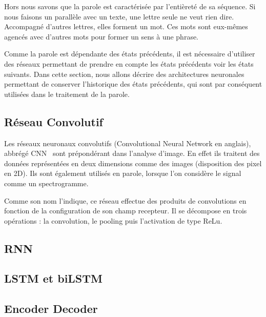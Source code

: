 Hors nous savons que la parole est caractérisée par l'entièreté de sa séquence. Si nous faisons un parallèle avec un texte, une lettre seule ne veut rien dire. Accompagné d'autres lettres, elles forment un mot. Ces mots sont eux-mêmes agencés avec d'autres mots pour former un sens à une phrase.

Comme la parole est dépendante des états précédents, il est nécessaire d'utiliser des réseaux permettant de prendre en compte les états précédents voir les états suivants. Dans cette section, nous allons décrire des architectures neuronales permettant de conserver l'historique des états précédents, qui sont par conséquent utilisées dans le traitement de la parole.

\subsection{Réseau Convolutif}
Les réseaux neuronaux convolutifs (Convolutional Neural Network en anglais), abbrégé CNN~\cite{LeCun1990} sont prépondérant dans l'analyse d'image. En effet ils traitent des données représentées en deux dimensions comme des images (disposition des pixel en 2D). Ils sont également utilisés en parole, lorsque l'on considère le signal comme un spectrogramme.

Comme son nom l'indique, ce réseau effectue des produits de convolutions en fonction de la configuration de son champ recepteur. Il se décompose en trois opérations : la convolution, le pooling puis l'activation de type ReLu.
\subsection{RNN}
\subsection{LSTM et biLSTM}
\subsection{Encoder Decoder}

